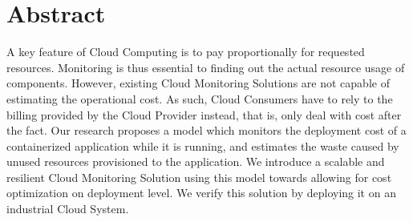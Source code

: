 \begingroup
\let\clearpage\relax
\let\cleardoublepage\relax
\let\cleardoublepage\relax

\chapter*{Abstract}
A key feature of Cloud Computing is to pay proportionally for requested resources. Monitoring is thus essential to finding out the actual resource usage of components. However, existing Cloud Monitoring Solutions are not capable of estimating the operational cost.
As such, Cloud Consumers have to rely to the billing provided by the Cloud Provider instead, that is, only deal with cost after the fact.
Our research proposes a model which monitors the deployment cost of a containerized application while it is running, and estimates the waste caused by unused resources provisioned to the application. 
We introduce a scalable and resilient Cloud Monitoring Solution using this model towards allowing for cost optimization on deployment level. We verify this solution by deploying it on an industrial Cloud System.
\vfill

\endgroup

\vfill
